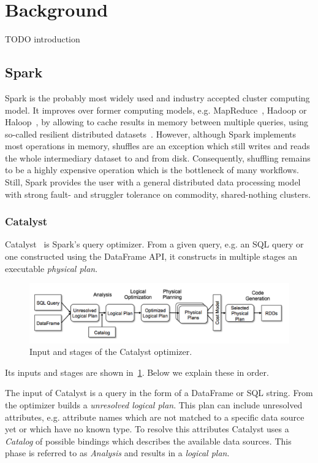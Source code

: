 \section{Background}\label{sec:background}

TODO introduction
\subsection{Spark}
Spark is the probably most widely used and industry accepted cluster computing model.
It improves over former computing models, e.g. MapReduce~\cite{mapreduce}, Hadoop or Haloop~\cite{haloop},
by allowing to cache results in memory between multiple queries, using so-called resilient distributed datasets~\cite{rdd}. %
However, although Spark implements most operations in memory, shuffles are an exception which still writes and reads
the whole intermediary dataset to and from disk.
Consequently, shuffling remains to be a highly expensive operation which is the bottleneck of many workflows.
Still, Spark provides the user with a general distributed data processing model with strong fault- and struggler tolerance
on commodity, shared-nothing clusters.



\subsubsection{Catalyst}
Catalyst~\cite{catalyst} is Spark's query optimizer.
From a given query, e.g. an SQL query or one constructed using the DataFrame API, it constructs
in multiple stages an executable \textit{physical plan}.
\begin{figure}
    \includegraphics{figures/catalyst-stages.png}
    \caption{Input and stages of the Catalyst optimizer.}
    \label{fig:catalyst-stages}
\end{figure}
Its inputs and stages are shown in~\cref{fig:catalyst-stages}.
Below we explain these in order.

The input of Catalyst is a query in the form of a DataFrame or SQL string.
From the optimizer builds a \textit{unresolved logical plan}.
This plan can include unresolved attributes, e.g. attribute names which are not matched to a specific
data source yet or which have no known type.
To resolve this attributes Catalyst uses a \textit{Catalog} of possible bindings which describes the
available data sources.
This phase is referred to as \textit{Analysis} and results in a \textit{logical plan}.

